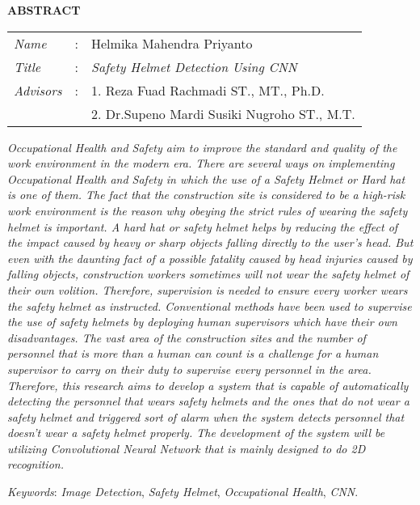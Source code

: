 \begin{center}
  \large\textbf{ABSTRACT}
\end{center}


\vspace{2ex}

\begingroup
  \setlength{\tabcolsep}{0pt}

  \noindent
  \begin{tabularx}{\textwidth}{l >{\centering}m{3em} X}
    \emph{Name}     &:& Helmika Mahendra Priyanto \\

    \emph{Title}    &:& \emph{Safety Helmet Detection Using CNN} \\

    \emph{Advisors} &:& 1. Reza Fuad Rachmadi ST., MT., Ph.D. \\
                    & & 2. Dr.Supeno Mardi Susiki Nugroho ST., M.T. \\
  \end{tabularx}
\endgroup

\emph{
  Occupational Health and Safety aim to improve the standard and quality of the work environment in the modern era. There are several ways on implementing Occupational Health and Safety in which the use of a Safety Helmet or Hard hat is one of them. The fact that the construction site is considered to be a high-risk work environment is the reason why obeying the strict rules of wearing the safety helmet is important. A hard hat or safety helmet helps by reducing the effect of the impact caused by heavy or sharp objects falling directly to the user’s head. But even with the daunting fact of a possible fatality caused by head injuries caused by falling objects, construction workers sometimes will not wear the safety helmet of their own volition. Therefore, supervision is needed to ensure every worker wears the safety helmet as instructed. Conventional methods have been used to supervise the use of safety helmets by deploying human supervisors which have their own disadvantages. The vast area of the construction sites and the number of personnel that is more than a human can count is a challenge for a human supervisor to carry on their duty to supervise every personnel in the area. Therefore, this research aims to develop a system that is capable of automatically detecting the personnel that wears safety helmets and the ones that do not wear a safety helmet and triggered sort of alarm when the system detects personnel that doesn’t wear a safety helmet properly. The development of the system will be utilizing Convolutional Neural Network that is mainly designed to do 2D recognition. 
  }

\emph{Keywords}: \emph{Image Detection}, \emph{Safety Helmet}, \emph{Occupational Health}, \emph{CNN}.
